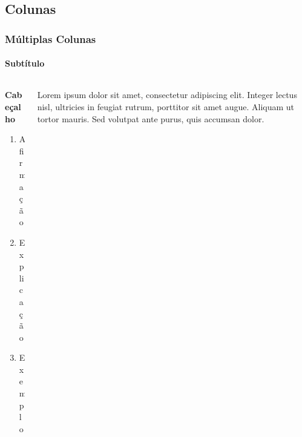 
\subsection{Colunas}

\begin{frame}
	\frametitle{Múltiplas Colunas}
	\framesubtitle{Subtítulo} %
	
	\begin{columns}[c] %
		\begin{column}{0.45\textwidth} %
			\textbf{Cabeçalho}
			\begin{enumerate}
				\item Afirmação
				\item Explicação
				\item Exemplo
			\end{enumerate}
		\end{column}
		\begin{column}{0.5\textwidth} %
			Lorem ipsum dolor sit amet, consectetur adipiscing elit. Integer lectus nisl, ultricies in feugiat rutrum, porttitor sit amet augue. Aliquam ut tortor mauris. Sed volutpat ante purus, quis accumsan dolor.
		\end{column}
	\end{columns}
\end{frame}
